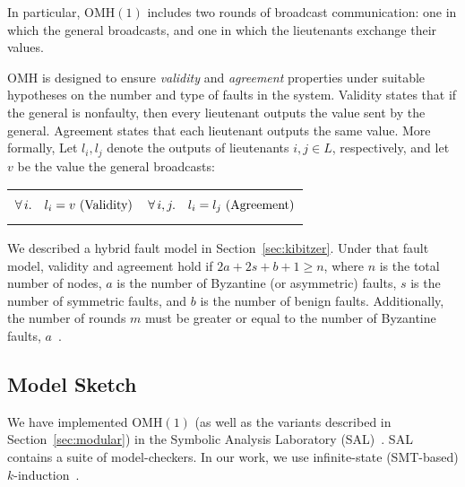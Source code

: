 \documentclass{llncs/llncs}
\newcommand{\OMH}{\ensuremath{\mathrm{OMH}}\xspace}
\begin{document}
\noindent
In particular, $\OMH(1)$ includes two rounds of broadcast communication: one in which the general broadcasts, and one in which the lieutenants exchange their values.

$\OMH$ is designed to ensure \emph{validity} and \emph{agreement} properties under suitable hypotheses on the number and type of faults in the system. Validity states that if the general is nonfaulty, then every lieutenant outputs the value sent by the general. Agreement states that each lieutenant outputs the same value. More formally, Let $l_i, l_j$ denote the outputs of lieutenants $i, j \in L$, respectively, and let $v$ be the value the general broadcasts:
\vspace{-0.4cm}
\noindent
\begin{center}
\begin{tabular}{l|l}
\begin{minipage}[t]{0.5\linewidth}
\begin{equation*}
    \forall \,i. \quad l_i = v \textnormal{ (Validity)}
\end{equation*}
\end{minipage}&
\begin{minipage}[t]{0.5\linewidth}
\begin{equation*}
    \forall \,i, j. \quad l_i = l_j \textnormal{ (Agreement)}
\end{equation*}
\end{minipage}
\end{tabular}
\end{center}

We described a hybrid fault model in Section~\ref{sec:kibitzer}. Under that fault model, validity and agreement hold if $2a+2s+b+1 \geq n$, where $n$ is the total number of nodes, $a$ is the number of Byzantine (or asymmetric) faults, $s$ is the number of symmetric faults, and $b$ is the number of benign faults. Additionally, the number of rounds $m$ must be greater or equal to the number of Byzantine faults, $a$~\cite{Lincoln-Rushby,hybrid}.


\subsection{Model Sketch}\label{sec:sketch}

We have implemented $\OMH(1)$ (as well as the variants described in Section~\ref{sec:modular}) in the Symbolic Analysis Laboratory (SAL)~\cite{SAL}. SAL contains a suite of model-checkers. In our work, we use infinite-state (SMT-based) $k$-induction~\cite{cal}.
\end{document}
